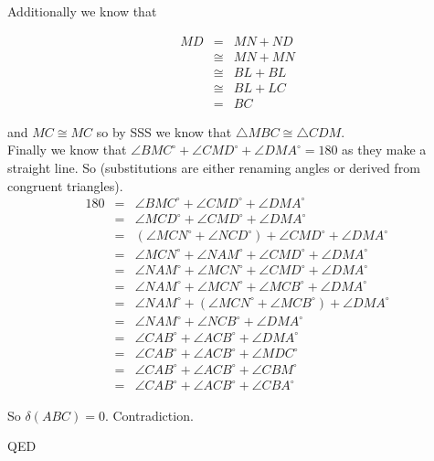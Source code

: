 \documentclass[12pt,letterpaper]{article}
\newcommand{\QED}{\begin{flushright}QED\end{flushright}}
\newcommand{\prob}[1]{\newpage\noindent {\bf #1}}
\begin{document}
Additionally we know that 

\begin{eqnarray*}
MD &=& MN + ND \\
&\cong & MN + MN \\
&\cong & BL + BL \\
&\cong & BL + LC\\
&=& BC
\end{eqnarray*}

and $MC \cong MC$ so by SSS we know that $\triangle MBC \cong \triangle CDM$.\\


Finally we know that $\angle BMC^\circ + \angle CMD^\circ + \angle DMA^\circ = 180$ as they make a straight line.  So (substitutions are either renaming angles or derived from congruent triangles).\\

\begin{eqnarray*}
180 &=& \angle BMC^\circ + \angle CMD^\circ + \angle DMA^\circ\\
&=& \angle MCD^\circ + \angle CMD^\circ + \angle DMA^\circ\\
&=& (\angle MCN^\circ + \angle NCD^\circ) + \angle CMD^\circ + \angle DMA^\circ\\
&=& \angle MCN^\circ + \angle NAM^\circ + \angle CMD^\circ + \angle DMA^\circ\\
&=& \angle NAM^\circ + \angle MCN^\circ + \angle CMD^\circ + \angle DMA^\circ\\
&=& \angle NAM^\circ + \angle MCN^\circ + \angle MCB^\circ + \angle DMA^\circ\\
&=& \angle NAM^\circ + (\angle MCN^\circ + \angle MCB^\circ) + \angle DMA^\circ\\
&=& \angle NAM^\circ + \angle NCB^\circ + \angle DMA^\circ\\
&=& \angle CAB^\circ + \angle ACB^\circ + \angle DMA^\circ\\
&=& \angle CAB^\circ + \angle ACB^\circ + \angle MDC^\circ\\
&=& \angle CAB^\circ + \angle ACB^\circ + \angle CBM^\circ\\
&=& \angle CAB^\circ + \angle ACB^\circ + \angle CBA^\circ
\end{eqnarray*}

So $\delta (ABC) = 0$.  Contradiction.


\QED





\prob{Chapter 7: K2 }
\end{document}
